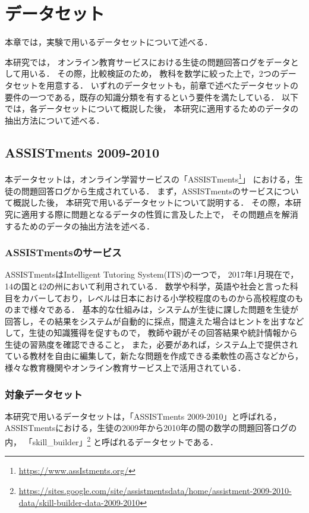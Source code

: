\chapter{データセット}
\label{chap:dataset}
\fancyhf{}
\rhead{\thepage}
\cfoot{\thepage}


本章では，実験で用いるデータセットについて述べる．

本研究では，
オンライン教育サービスにおける生徒の問題回答ログをデータとして用いる．
その際，比較検証のため，
教科を数学に絞った上で，2つのデータセットを用意する．
いずれのデータセットも，前章で述べたデータセットの要件の一つである，既存の知識分類を有するという要件を満たしている．
以下では，各データセットについて概説した後，
本研究に適用するためのデータの抽出方法について述べる．


\section{ASSISTments 2009-2010}
本データセットは，オンライン学習サービスの「ASSISTments\footnote{\url{https://www.assIstments.org/}}」
における，生徒の問題回答ログから生成されている．
まず，ASSISTmentsのサービスについて概説した後，
本研究で用いるデータセットについて説明する．
その際，本研究に適用する際に問題となるデータの性質に言及した上で，
その問題点を解消するためのデータの抽出方法を述べる．

\subsection{ASSISTmentsのサービス}
ASSISTmentsはIntelligent Tutoring System(ITS)の一つで，
2017年1月現在で，14の国と42の州において利用されている．
数学や科学，英語や社会と言った科目をカバーしており，レベルは日本における小学校程度のものから高校程度のものまで様々である．
基本的な仕組みは，システムが生徒に課した問題を生徒が回答し，その結果をシステムが自動的に採点，間違えた場合はヒントを出すなどして，生徒の知識獲得を促すもので，
教師や親がその回答結果や統計情報から生徒の習熟度を確認できること，
また，必要があれば，システム上で提供されている教材を自由に編集して，新たな問題を作成できる柔軟性の高さなどから，
様々な教育機関やオンライン教育サービス上で活用されている．


\subsection{対象データセット}
本研究で用いるデータセットは，「ASSISTments 2009-2010」と呼ばれる，
ASSISTmentsにおける，生徒の2009年から2010年の間の数学の問題回答ログの内，
「skill\_builder」\footnote{\url{https://sites.google.com/site/assistmentsdata/home/assistment-2009-2010-data/skill-builder-data-2009-2010}}
と呼ばれるデータセットである．

